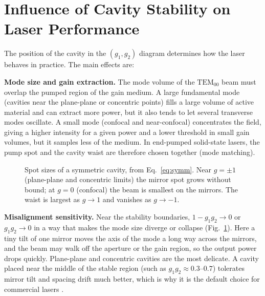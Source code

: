 \documentclass[11pt,a4paper]{article}
\begin{document}
	\section{Influence of Cavity Stability on Laser Performance}
	
	The position of the cavity in the $(g_1,g_2)$ diagram determines how the laser behaves in practice. The main effects are:
	
	\textbf{Mode size and gain extraction.} The mode volume of the $\mathrm{TEM}_{00}$ beam must overlap the pumped region of the gain medium. A large fundamental mode (cavities near the plane-plane or concentric points) fills a large volume of active material and can extract more power, but it also tends to let several transverse modes oscillate. A small mode (confocal and near-confocal) concentrates the field, giving a higher intensity for a given power and a lower threshold in small gain volumes, but it samples less of the medium. In end-pumped solid-state lasers, the pump spot and the cavity waist are therefore chosen together (mode matching).
	
	\begin{figure}[ht]
		\centering
		\caption{Spot sizes of a symmetric cavity, from Eq.~\eqref{eq:symm}. Near $g=\pm1$ (plane-plane and concentric limits) the mirror spot grows without bound; at $g=0$ (confocal) the beam is smallest on the mirrors. The waist is largest as $g\to1$ and vanishes as $g\to-1$.}
		\label{fig:spotsizes}
	\end{figure}
	
	\textbf{Misalignment sensitivity.} Near the stability boundaries, $1-g_1g_2\to 0$ or $g_1g_2\to0$ in a way that makes the mode size diverge or collapse (Fig.~\ref{fig:spotsizes}). Here a tiny tilt of one mirror moves the axis of the mode a long way across the mirrors, and the beam may walk off the aperture or the gain region, so the output power drops quickly. Plane-plane and concentric cavities are the most delicate. A cavity placed near the middle of the stable region (such as $g_1g_2\approx0.3$--$0.7$) tolerates mirror tilt and spacing drift much better, which is why it is the default choice for commercial lasers \cite{Siegman,HodgsonWeber}.
	
\end{document}
